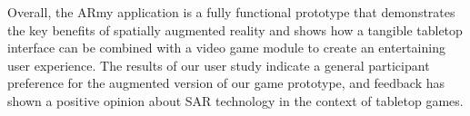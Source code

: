 \documentclass[review]{vgtc}                 %
\begin{document}
Overall, the ARmy application is a fully functional prototype that
demonstrates the key benefits of spatially augmented reality and shows
how a tangible tabletop interface can be combined with a video game
module to create an entertaining user experience.  The results of our
user study indicate a general participant preference for the augmented
version of our game prototype, and feedback has shown a positive
opinion about SAR technology in the context of tabletop
games. 




\end{document}
